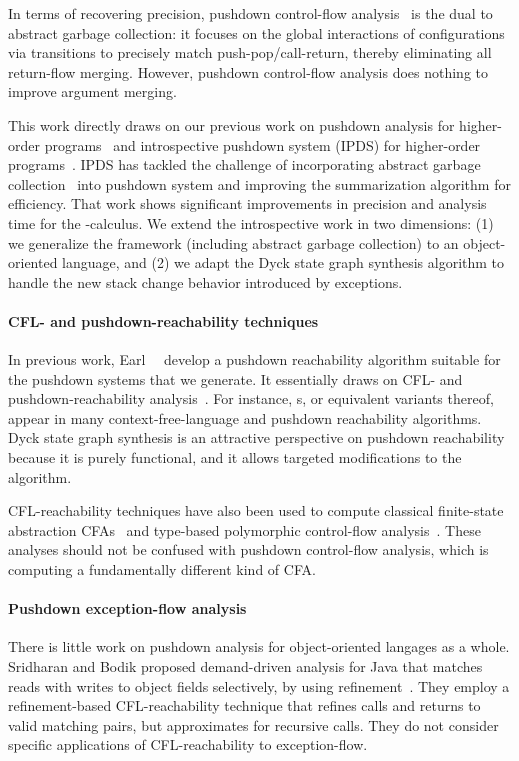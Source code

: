 In terms of recovering precision, pushdown control-flow
analysis~\cite{local:Earl:2010:PDCFA} is the dual to abstract garbage
collection:
it focuses on the global interactions of configurations via
transitions to precisely match push-pop/call-return, thereby
eliminating all return-flow merging.
However, pushdown control-flow analysis does nothing to improve
argument merging.

This work directly draws on our previous work 
on pushdown analysis for higher-order programs~\cite{local:Earl:2010:PDCFA} and
 introspective pushdown system (IPDS) for higher-order programs~\cite{Earl:2012:IPDCFA}.
IPDS  has tackled the challenge of incorporating abstract garbage collection~\cite{mattmight:Might:2006:GammaCFA}
into pushdown system and improving the summarization algorithm  for efficiency.
That work shows significant  improvements in precision and analysis time for the -calculus.
We extend the introspective work in two dimensions: (1)  we generalize the framework (including abstract garbage collection) to an object-oriented language,
and (2) we adapt the Dyck state graph synthesis algorithm to handle the new stack change behavior
introduced by exceptions.


\paragraph{\textbf{CFL- and pushdown-reachability techniques}}
In previous work, Earl~\etal~\cite{Earl:2012:IPDCFA}
develop a pushdown reachability algorithm
suitable for the pushdown systems that we generate.
It essentially draws on CFL- and pushdown-reachability
analysis~\cite{mattmight:Bouajjani:1997:PDA-Reachability,mattmight:Kodumal:2004:CFL,mattmight:Reps:1998:CFL,mattmight:Reps:2005:Weighted-PDA}.
For instance, \ecg s, or equivalent variants thereof, appear in many
context-free-language and pushdown reachability algorithms.
Dyck state graph synthesis is an attractive perspective
on pushdown reachability because it is purely functional,
and it allows targeted modifications to the algorithm.


CFL-reachability techniques have also been used to compute classical
finite-state abstraction CFAs~\cite{mattmight:Melski:2000:CFL} and
type-based polymorphic control-flow
analysis~\cite{mattmight:Rehof:2001:TypeBased}.
These analyses should not be confused with pushdown control-flow
analysis, which is computing a fundamentally different kind of CFA.

\paragraph{\textbf{Pushdown exception-flow analysis}}
There is little work on pushdown analysis for object-oriented langages as a whole.
Sridharan and Bodik proposed demand-driven analysis for Java that
matches reads with writes to object fields selectively, by using
refinement~\cite{Manu:2006:RefinementJava}.  They employ a
refinement-based CFL-reachability technique that refines calls and
returns to valid matching pairs, but approximates for recursive calls.
They do not consider specific applications of CFL-reachability to
exception-flow.
 

